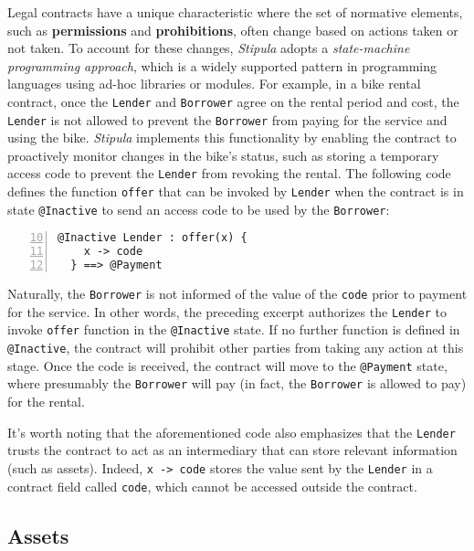 Legal contracts have a unique characteristic where the set of normative elements, such as 
\textbf{permissions} and \textbf{prohibitions}, often change based on actions taken or not taken. To 
account for these changes, \textit{Stipula} adopts a \textit{state-machine programming approach}, which is 
a widely supported pattern in programming languages using ad-hoc libraries or modules. For example, in a 
bike rental contract, once the \verb|Lender| and \verb|Borrower| agree on the rental period and cost, the 
\verb|Lender| is not allowed to prevent the \verb|Borrower| from paying for the service and using the bike. 
\textit{Stipula} implements this functionality by enabling the contract to proactively monitor changes in 
the bike's status, such as storing a temporary access code to prevent the \verb|Lender| from revoking the 
rental. The following code defines the function \verb|offer| that can be invoked by \verb|Lender| when the 
contract is in state \verb|@Inactive| to send an access code to be used by the \verb|Borrower|:

\begin{Verbatim}[numbers=left,xleftmargin=1cm,firstnumber=10,breaklines=true,breakanywhere=true,tabsize=2]
  @Inactive Lender : offer(x) { 
    x -> code
  } ==> @Payment
\end{Verbatim}

Naturally, the \verb|Borrower| is not informed of the value of the \verb|code| prior to payment for the 
service. In other words, the preceding excerpt authorizes the \verb|Lender| to invoke \verb|offer| 
function in the \verb|@Inactive| state. If no further function is defined in \verb|@Inactive|, the contract 
will prohibit other parties from taking any action at this stage. Once the code is received, the contract 
will move to the \verb|@Payment| state, where presumably the \verb|Borrower| will pay (in fact, the 
\verb|Borrower| is allowed to pay) for the rental.

It's worth noting that the aforementioned code also emphasizes that the \verb|Lender| trusts the contract 
to act as an intermediary that can store relevant information (such as assets). Indeed, \verb|x -> code| 
stores the value sent by the \verb|Lender| in a contract field called \verb|code|, which cannot be accessed 
outside the contract.

\subsection{Assets}

